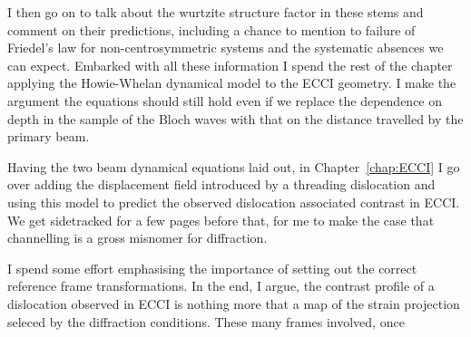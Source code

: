 I then go on to talk about the wurtzite structure factor in these stems and comment on their predictions, including a chance to mention to failure of Friedel's law for non-centrosymmetric systems and the systematic absences we can expect. Embarked with all these information I spend the rest of the chapter applying the Howie-Whelan dynamical model to the ECCI geometry. I make the argument the equations should still hold even if we replace the dependence on depth in the sample of the Bloch waves with that on the distance travelled by the primary beam.  

Having the two beam dynamical equations laid out, in Chapter~\ref{chap:ECCI} I go over adding the displacement field introduced by a threading dislocation and using this model to predict the observed dislocation associated contrast in ECCI. We get sidetracked for a few pages before that, for me to make the case that channelling is a gross misnomer for diffraction. 

I spend some effort emphasising the importance of setting out the correct reference frame transformations. In the  end, I argue, the contrast profile of a dislocation observed in ECCI is nothing more that a map of the strain projection seleced by the diffraction conditions. These many frames involved, once 